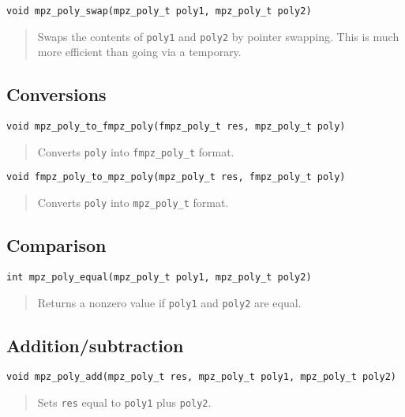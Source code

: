 \documentclass[a4paper,10pt]{article}
\newcommand{\code}{\lstinline}
\begin{document}
\begin{lstlisting}
void mpz_poly_swap(mpz_poly_t poly1, mpz_poly_t poly2)
\end{lstlisting}
\begin{quote}
Swaps the contents of \code{poly1} and \code{poly2} by pointer swapping. This is much more efficient than going via a temporary.
\end{quote}


\subsection{Conversions}

\begin{lstlisting}
void mpz_poly_to_fmpz_poly(fmpz_poly_t res, mpz_poly_t poly)
\end{lstlisting}
\begin{quote}
Converts \code{poly} into \code{fmpz_poly_t} format.
\end{quote}

\begin{lstlisting}
void fmpz_poly_to_mpz_poly(mpz_poly_t res, fmpz_poly_t poly)
\end{lstlisting}
\begin{quote}
Converts \code{poly} into \code{mpz_poly_t} format.
\end{quote}



\subsection{Comparison}


\begin{lstlisting}
int mpz_poly_equal(mpz_poly_t poly1, mpz_poly_t poly2)
\end{lstlisting}
\begin{quote}
Returns a nonzero value if \code{poly1} and \code{poly2} are equal.
\end{quote}



\subsection{Addition/subtraction}


\begin{lstlisting}
void mpz_poly_add(mpz_poly_t res, mpz_poly_t poly1, mpz_poly_t poly2)
\end{lstlisting}
\begin{quote}
Sets \code{res} equal to \code{poly1} plus \code{poly2}.
\end{quote}
\end{document}
